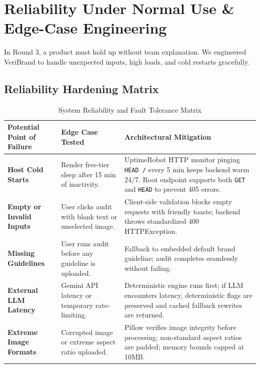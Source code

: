 \documentclass[11pt,a4paper]{article}
\begin{document}
\newpage

\section{Reliability Under Normal Use \& Edge-Case Engineering}

In Round 3, a product must hold up without team explanation. We engineered VeriBrand to handle unexpected inputs, high loads, and cold restarts gracefully.

\subsection{Reliability Hardening Matrix}

\begin{table}[H]
\centering
\small
\begin{tabular}{@{}p{3.5cm}p{5cm}p{5.5cm}@{}}
\toprule
\textbf{Potential Point of Failure} & \textbf{Edge Case Tested} & \textbf{Architectural Mitigation} \\
\midrule
\textbf{Host Cold Starts} & Render free-tier sleep after 15 min of inactivity. & UptimeRobot HTTP monitor pinging \texttt{HEAD /} every 5 min keeps backend warm 24/7. Root endpoint supports both \texttt{GET} and \texttt{HEAD} to prevent 405 errors. \\
\midrule
\textbf{Empty or Invalid Inputs} & User clicks audit with blank text or unselected image. & Client-side validation blocks empty requests with friendly toasts; backend throws standardized 400 HTTPException. \\
\midrule
\textbf{Missing Guidelines} & User runs audit before any guideline is uploaded. & Fallback to embedded default brand guideline; audit completes seamlessly without failing. \\
\midrule
\textbf{External LLM Latency} & Gemini API latency or temporary rate-limiting. & Deterministic engine runs first; if LLM encounters latency, deterministic flags are preserved and cached fallback rewrites are returned. \\
\midrule
\textbf{Extreme Image Formats} & Corrupted image or extreme aspect ratio uploaded. & Pillow verifies image integrity before processing; non-standard aspect ratios are padded; memory bounds capped at 10MB. \\
\bottomrule
\end{tabular}
\caption{System Reliability and Fault Tolerance Matrix}
\end{table}
\end{document}

